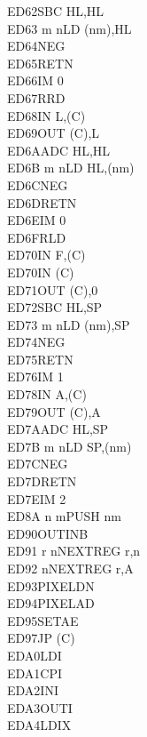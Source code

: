 \begin{multicols}{3}
{\begin{tabbing}
    ED62\>SBC HL,HL\\
    ED63 m n\>LD (nm),HL\\
    ED64\>NEG\UNDOC\\
    ED65\>RETN\UNDOC\\
    ED66\>IM 0\UNDOC\\
    ED67\>RRD\\
    ED68\>IN L,(C)\\
    ED69\>OUT (C),L\\
    ED6A\>ADC HL,HL\\
    ED6B m n\>LD HL,(nm)\\
    ED6C\>NEG\UNDOC\\
    ED6D\>RETN\UNDOC\\
    ED6E\>IM 0\UNDOC\\
    ED6F\>RLD\\
    ED70\>IN F,(C)\UNDOC\\
    ED70\>IN (C)\UNDOC\\
    ED71\>OUT (C),0\UNDOC\\
    ED72\>SBC HL,SP\\
    ED73 m n\>LD (nm),SP\\
    ED74\>NEG\UNDOC\\
    ED75\>RETN\UNDOC\\
    ED76\>IM 1\UNDOC\\
    ED78\>IN A,(C)\\
    ED79\>OUT (C),A\\
    ED7A\>ADC HL,SP\\
    ED7B m n\>LD SP,(nm)\\
    ED7C\>NEG\UNDOC\\
    ED7D\>RETN\UNDOC\\
    ED7E\>IM 2\UNDOC\\
    ED8A n m\>PUSH nm\ZXN\\
    ED90\>OUTINB\ZXN\\
    ED91 r n\>NEXTREG r,n\ZXN\\
    ED92 n\>NEXTREG r,A\ZXN\\
    ED93\>PIXELDN\ZXN\\
    ED94\>PIXELAD\ZXN\\
    ED95\>SETAE\ZXN\\
    ED97\>JP (C)\ZXN\\
    EDA0\>LDI\\
    EDA1\>CPI\\
    EDA2\>INI\\
    EDA3\>OUTI\\
    EDA4\>LDIX\ZXN\\

\end{tabbing}}
\end{multicols}
